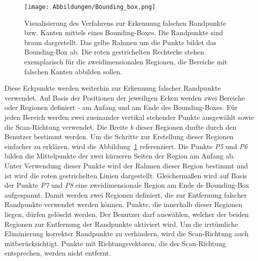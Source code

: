 \begin{figure}[h]
	\texttt{[image: Abbildungen/Bounding\_box.png]}
	\centering
	\caption[Entfernung falscher Randpunkte mittels Bounding-Boxen]{Visualisierung des Verfahrens zur Erkennung falschen Randpunkte bzw. Kanten mittels eines Bounding-Boxes. Die Randpunkte sind braun dargestellt. Das gelbe Rahmen um die Punkte bildet das Bounding-Box ab. Die roten gestrichelten Rechtecke stehen exemplarisch für die zweidimensionalen Regionen, die Bereiche mit falschen Kanten abbilden sollen.}
	\label{fig: bounding_box}
\end{figure}

Diese Eckpunkte werden weiterhin zur Erkennung falscher Randpunkte verwendet. Auf Basis der Positionen der jeweiligen Ecken werden zwei Bereiche oder Regionen definiert - am Anfang und am Ende des Bounding-Boxes. Für jeden Bereich werden zwei zueinander vertikal stehender Punkte ausgewählt sowie die Scan-Richtung verwendet. Die Breite \textit{b} dieser Regionen durfte durch den Benutzer bestimmt werden. Um die Schritte zur Erstellung dieser Regionen einfacher zu erklären, wird die Abbildung~\ref{fig: bounding_box} referenziert. Die Punkte \textit{P5} und \textit{P6} bilden die Mittelpunkte der zwei kürzeren Seiten der Region am Anfang ab. Unter Verwendung dieser Punkte wird der Rahmen dieser Region bestimmt und ist wird die roten gestrichelten Linien dargestellt. Gleichermaßen wird auf Basis der Punkte \textit{P7} und \textit{P8} eine zweidimensionale Region am Ende de Bounding-Box aufgespannt. Damit werden zwei Regionen definiert, die zur Entfernung falscher Randpunkte verwendet werden können. Punkte, die innerhalb dieser Regionen liegen, dürfen gelöscht werden. Der Benutzer darf auswählen, welcher der beiden Regionen zur Entfernung der Randpunkte aktiviert wird. Um die irrtümliche Eliminierung korrekter Randpunkte zu verhindern, wird die Scan-Richtung auch mitberücksichtigt. Punkte mit Richtungsvektoren, die der Scan-Richtung entsprechen, werden nicht entfernt. 


